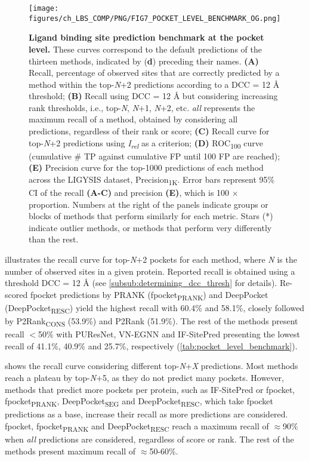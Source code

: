 \begin{figure}[ht!]
    \centering
    \texttt{[image: figures/ch\_LBS\_COMP/PNG/FIG7\_POCKET\_LEVEL\_BENCHMARK\_OG.png]}
    \caption[Ligand binding site prediction benchmark at the pocket level]{\textbf{Ligand binding site prediction benchmark at the pocket level.} These curves correspond to the default predictions of the thirteen methods, indicated by (\textbf{d}) preceding their names. \textbf{(A)} Recall, percentage of observed sites that are correctly predicted by a method within the top-\textit{N}+2 predictions according to a DCC = 12 \AA{} threshold; \textbf{(B)} Recall using DCC = 12 \AA{} but considering increasing rank thresholds, i.e., top-\textit{N}, \textit{N}+1, \textit{N}+2, etc. \textit{all} represents the maximum recall of a method, obtained by considering all predictions, regardless of their rank or score; \textbf{(C)} Recall curve for top-\textit{N}+2 predictions using \textit{I\textsubscript{rel}} as a criterion; \textbf{(D)} ROC\textsubscript{100} curve (cumulative \# TP against cumulative FP until 100 FP are reached); \textbf{(E)} Precision curve for the top-1000 predictions of each method across the LIGYSIS dataset, Precision\textsubscript{1K}. Error bars represent 95\% CI of the recall \textbf{(A-C)} and precision \textbf{(E)}, which is 100 $\times$ proportion. Numbers at the right of the panels indicate groups or blocks of methods that perform similarly for each metric. Stars (*) indicate outlier methods, or methods that perform very differently than the rest.}
    \label{fig:pocket_level_benchmark_OG}
\end{figure}

 illustrates the recall curve for top-\textit{N}+2 pockets for each method, where \textit{N} is the number of observed sites in a given protein. Reported recall is obtained using a threshold DCC = 12 \AA{} (see \autoref{subsub:determining_dcc_thresh} for details). Re-scored fpocket predictions by PRANK (fpocket\textsubscript{PRANK}) and DeepPocket (DeepPocket\textsubscript{RESC}) yield the highest recall with 60.4\% and 58.1\%, closely followed by P2Rank\textsubscript{CONS} (53.9\%) and P2Rank (51.9\%). The rest of the methods present recall $<$50\% with PUResNet, VN-EGNN and IF-SitePred presenting the lowest recall of 41.1\%, 40.9\% and 25.7\%, respectively (\autoref{tab:pocket_level_benchmark}).

 shows the recall curve considering different top-\textit{N}+\textit{X} predictions. Most methods reach a plateau by top-\textit{N}+5, as they do not predict many pockets. However, methods that predict more pockets per protein, such as IF-SitePred or fpocket, fpocket\textsubscript{PRANK}, DeepPocket\textsubscript{SEG} and DeepPocket\textsubscript{RESC}, which take fpocket predictions as a base, increase their recall as more predictions are considered. fpocket, fpocket\textsubscript{PRANK} and DeepPocket\textsubscript{RESC} reach a maximum recall of $\approx$90\% when \textit{all} predictions are considered, regardless of score or rank. The rest of the methods present maximum recall of $\approx$50-60\%.

